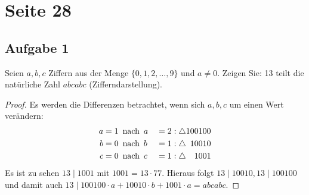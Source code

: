 \section{Seite 28}

\subsection{Aufgabe 1}
Seien $a,b,c$ Ziffern aus der Menge $\{0,1,2,\dotsc,9\}$ und $a \neq 0$.
Zeigen Sie: 13 teilt die natürliche Zahl $abcabc$ (Zifferndarstellung).
\begin{proof}
  Es werden die Differenzen betrachtet, wenn sich $a, b, c$ um einen Wert verändern:
  \begin{alignat*}{2}
    a & = 1 \enspace\text{nach}\enspace a &  & = 2 : \triangle 100100            \\
    b & = 0 \enspace\text{nach}\enspace b &  & = 1 : \triangle \hphantom{0}10010 \\
    c & = 0 \enspace\text{nach}\enspace c &  & = 1 : \triangle \hphantom{00}1001
  \end{alignat*}
  Es ist zu sehen $13 \mid 1001$ mit $1001 = 13 \cdot 77$.
  Hieraus folgt $13 \mid 10010, 13 \mid 100100$ und damit auch
  $13 \mid 100100 \cdot a + 10010 \cdot b + 1001 \cdot a = abcabc$.
\end{proof}

